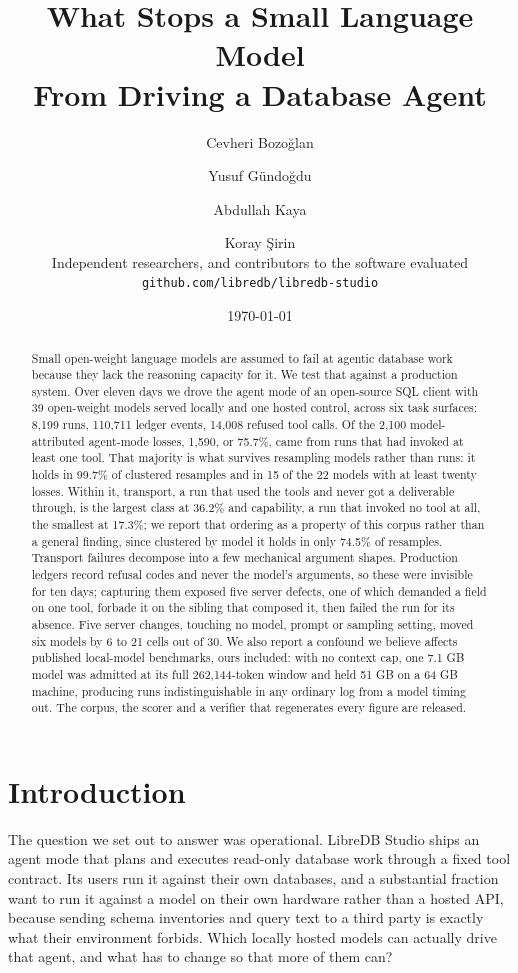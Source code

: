 \documentclass[11pt]{article}
\title{\bfseries What Stops a Small Language Model\\ From Driving a Database Agent}
\author{
  Cevheri Bozo\u{g}lan \and Yusuf G\"{u}ndo\u{g}du \and Abdullah Kaya \and Koray \c{S}irin\\[4pt]
  \normalsize Independent researchers, and contributors to the software evaluated\\
  \normalsize \texttt{github.com/libredb/libredb-studio}
}
\date{\today}
\begin{document}
\maketitle

\begin{abstract}
\noindent
Small open-weight language models are assumed to fail at agentic database work because they lack the reasoning
capacity for it. We test that against a production system. Over eleven days we drove the agent mode of an
open-source SQL client with 39 open-weight models served locally and one hosted control, across six task
surfaces: 8{,}199 runs, 110{,}711 ledger events, 14{,}008 refused tool calls. Of the 2{,}100 model-attributed
agent-mode losses, 1{,}590, or 75.7\%, came from runs that had invoked at least one tool. That majority is what
survives resampling models rather than runs: it holds in 99.7\% of clustered resamples and in 15 of the 22 models
with at least twenty losses. Within it, transport, a run that used the tools and never got a deliverable through,
is the largest class at 36.2\% and capability, a run that invoked no tool at all, the smallest at 17.3\%; we
report that ordering as a property of this corpus rather than a general finding, since clustered by model it
holds in only 74.5\% of resamples. Transport failures decompose into a few mechanical argument shapes. Production
ledgers record refusal codes and never the model's arguments, so these were invisible for ten days; capturing
them exposed five server defects, one of which demanded a field on one tool, forbade it on the sibling that
composed it, then failed the run for its absence. Five server changes, touching no model, prompt or sampling
setting, moved six models by 6 to 21 cells out of 30. We also report a confound we believe affects published
local-model benchmarks, ours included: with no context cap, one 7.1 GB model was admitted at its full
262{,}144-token window and held 51 GB on a 64 GB machine, producing runs indistinguishable in any ordinary log
from a model timing out. The corpus, the scorer and a verifier that regenerates every figure are released.
\end{abstract}

\section{Introduction}

The question we set out to answer was operational. LibreDB Studio ships an agent mode that plans and executes
read-only database work through a fixed tool contract. Its users run it against their own databases, and a
substantial fraction want to run it against a model on their own hardware rather than a hosted API, because
sending schema inventories and query text to a third party is exactly what their environment forbids. Which
locally hosted models can actually drive that agent, and what has to change so that more of them can?
\end{document}
